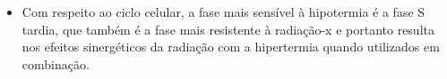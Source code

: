 \documentclass[11pt,a4paper]{article}
\newcounter{exemplo}
\begin{document}
\begin{exemplo}
\begin{itemize}
        \item Com respeito ao ciclo celular, a fase mais sensível à hipotermia é a fase S tardia, que também é a fase mais resistente à radiação-x e portanto resulta nos efeitos sinergéticos da radiação com a hipertermia quando utilizados em combinação. 
        
    \end{itemize}

\end{exemplo}


\end{document}
